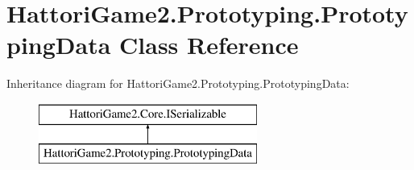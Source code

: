 \hypertarget{class_hattori_game2_1_1_prototyping_1_1_prototyping_data}{}\section{Hattori\+Game2.\+Prototyping.\+Prototyping\+Data Class Reference}
\label{class_hattori_game2_1_1_prototyping_1_1_prototyping_data}
Inheritance diagram for Hattori\+Game2.\+Prototyping.\+Prototyping\+Data\+:\begin{figure}[H]
\begin{center}
\leavevmode
\includegraphics[height=2.000000cm]{class_hattori_game2_1_1_prototyping_1_1_prototyping_data}
\end{center}
\end{figure}
